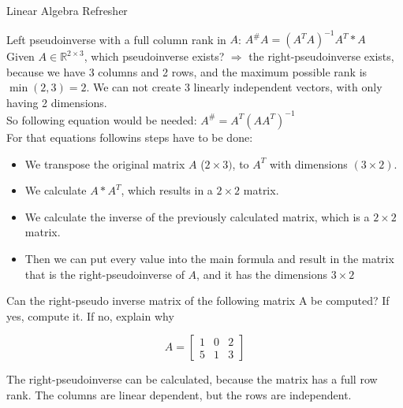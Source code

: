 \documentclass[
	english,
        solution=true
	]{tudaexercise}
\newcommand{\R}{\mathbb{R}}
\begin{document}
\begin{task}[points=28]{Linear Algebra Refresher}
\begin{subtask}[points=3,title=Matrix Pseudoinverse]
\begin{solution}
Left pseudoinverse with a full column rank in $A$: $A^\#A=(A^TA)^{-1}A^T*A$\\

Given $A\in \R^{2\times 3}$, which pseudoinverse exists? $\Rightarrow $ the right-pseudoinverse exists, because we have 3 columns and 2 rows, and the maximum possible rank is $\min(2, 3)=2$. We can not create 3 linearly independent vectors, with only having 2 dimensions.\\

So following equation would be needed: $A^\# = A^T(AA^T)^{-1}$\\
For that equations followins steps have to be done:
\begin{itemize}
    \item We transpose the original matrix $A$ ($2\times 3)$, to $A^T$ with dimensions $(3\times 2)$.
    \item We calculate $A * A^T$, which results in a $2\times 2$ matrix.
    \item We calculate the inverse of the previously calculated matrix, which is a $2 \times 2$ matrix.
    \item Then we can put every value into the main formula and result in the matrix that is the right-pseudoinverse of $A$, and it has the dimensions $3\times 2$
\end{itemize}
\end{solution}
\end{subtask}


\begin{subtask}[points=3,title=Matrix Pseudoinverse applied]

Can the right-pseudo inverse matrix of the following matrix A be computed? If yes, compute it. If no, explain why

\begin{equation*}
     A = 
     \begin{bmatrix}
     1 & 0 & 2 \\
     5 & 1 & 3 
     \end{bmatrix} 
\end{equation*}

\begin{solution}

The right-pseudoinverse can be calculated, because the matrix has a full row rank. The columns are linear dependent, but the rows are independent.\\



\end{solution}
\end{subtask}
\end{task}
\end{document}

